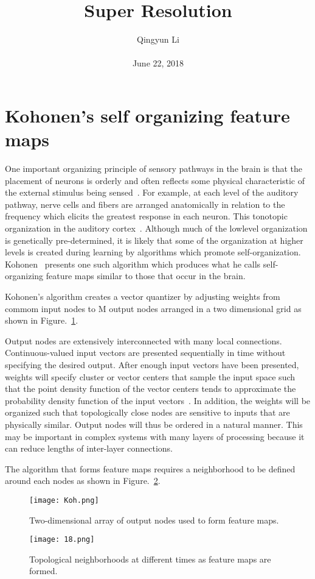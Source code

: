 \documentclass[10pt,twocolumn,letterpaper]{article}
\begin{document}
\author{Qingyun Li\\\\
June 22, 2018}        
\title{Super Resolution}

\maketitle

\section{Kohonen's self organizing feature maps}
\par One important organizing principle of sensory pathways in the brain is that the placement of neurons is orderly and often reflects some physical characteristic of the external stimulus being sensed~\cite{kandel2000principles}. For example, at each level of the auditory pathway, nerve cells and fibers are arranged anatomically in relation to the frequency which elicits the greatest response in each neuron. This tonotopic organization in the auditory cortex~\cite{kandel2000principles}. Although much of the lowlevel organization is genetically pre-determined, it is likely that some of the organization at higher levels is created during learning by algorithms which promote self-organization. Kohonen~\cite{Kohonen1984Self} presents one such algorithm which produces what he calls self-organizing feature maps similar to those that occur in the brain.
\par Kohonen's algorithm creates a vector quantizer by adjusting weights from commom input nodes to M output nodes arranged in a two dimensional grid as shown in Figure.~\ref{17}. 
\par Output nodes are extensively interconnected with many local connections. Continuous-valued input vectors are presented sequentially in time without specifying the desired output. After enough input vectors have been presented, weights will specify cluster or vector centers that sample the input space such that the point density function of the vector centers tends to approximate the probability density function of the input vectors~\cite{Kohonen1984Self}. In addition, the weights will be organized such that topologically close nodes are sensitive to inputs that are physically similar. Output nodes will thus be ordered in a natural manner. This may be important in complex systems with many layers of processing because it can reduce lengths of inter-layer connections.
\par The algorithm that forms feature maps requires a neighborhood to be defined around each nodes as shown in Figure.~\ref{18}. 
\begin{figure}[htbp]
 \centering{}
\texttt{[image: Koh.png]}\\
 \caption{Two-dimensional array of output nodes used to form feature maps.}
\label{17}
\end{figure}
\begin{figure}[htbp]
 \centering{}
\texttt{[image: 18.png]}\\
 \caption{Topological neighborhoods at different times as feature maps are formed.}
\label{18}
\end{figure}
 
 
\end{document}

